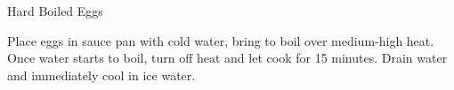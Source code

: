 
\begin{recipe}{Hard Boiled Eggs}%
  \maketitle

  Place eggs in sauce pan with cold water, bring to boil over medium-high
  heat. Once water starts to boil, turn off heat and let cook for 15
  minutes. Drain water and immediately cool in ice water.
\end{recipe}

